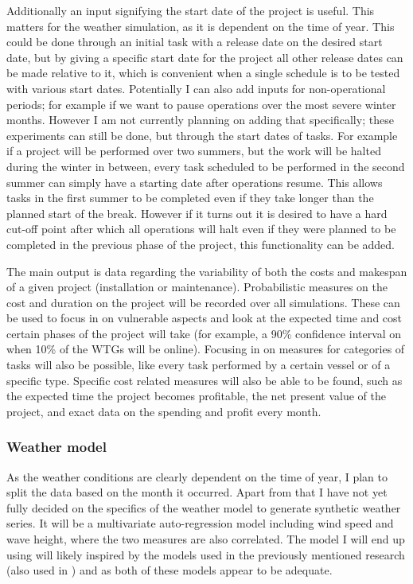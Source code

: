 \documentclass[a4paper,12pt]{article}
\begin{document}
Additionally an input signifying the start date of the project is useful. This matters for the weather simulation, as it is dependent on the time of year. This could be done through an initial task with a release date on the desired start date, but by giving a specific start date for the project all other release dates can be made relative to it, which is convenient when a single schedule is to be tested with various start dates. Potentially I can also add inputs for non-operational periods; for example if we want to pause operations over the most severe winter months. However I am not currently planning on adding that specifically; these experiments can still be done, but through the start dates of tasks. For example if a project will be performed over two summers, but the work will be halted during the winter in between, every task scheduled to be performed in the second summer can simply have a starting date after operations resume. This allows tasks in the first summer to be completed even if they take longer than the planned start of the break. However if it turns out it is desired to have a hard cut-off point after which all operations will halt even if they were planned to be completed in the previous phase of the project, this functionality can be added. 

The main output is data regarding the variability of both the costs and makespan of a given project (installation or maintenance). Probabilistic measures on the cost and duration on the project will be recorded over all simulations. These can be used to focus in on vulnerable aspects and look at the expected time and cost certain phases of the project will take (for example, a 90\% confidence interval on when 10\% of the WTGs will be online). Focusing in on measures for categories of tasks will also be possible, like every task performed by a certain vessel or of a specific type. Specific cost related measures will also be able to be found, such as the expected time the project becomes profitable, the net present value of the project, and exact data on the spending and profit every month. 

\subsubsection{Weather model} \label{sss:wemo}
As the weather conditions are clearly dependent on the time of year, I plan to split the data based on the month it occurred. Apart from that I have not yet fully decided on the specifics of the weather model to generate synthetic weather series. It will be a multivariate auto-regression model including wind speed and wave height, where the two measures are also correlated. The model I will end up using will likely inspired by the models used in the previously mentioned research \cite{dinwoodie2014operational} (also used in \cite{barlow2018mixed}) and \cite{kerkhove2017optimised} as both of these models appear to be adequate.
\end{document}
